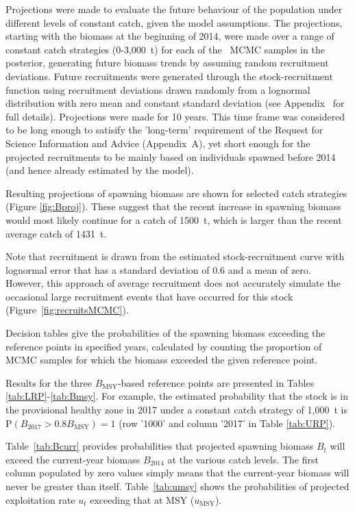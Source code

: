 \documentclass[11pt]{book}
\newcommand{\Bmsy}{B_\mathrm{MSY}}
\begin{document}
Projections were made to evaluate the future behaviour of the population under different levels of constant catch, given the model assumptions.  The projections, starting with the biomass at the beginning of 2014, were made over a range of constant catch strategies (0-3,000~t) for each of the \numMCMC~MCMC samples in the posterior, generating future biomass trends by assuming random recruitment deviations.  Future recruitments were generated through the stock-recruitment function using recruitment deviations drawn randomly from a lognormal distribution with zero mean and constant standard deviation (see Appendix~\eqnchapter{} for full details). Projections were made for 10 years. This time frame was considered to be long enough to satisify the 'long-term' requirement of the Request for Science Information and Advice (Appendix~A), yet short enough for the projected recruitments to be mainly based on individuals spawned before 2014 (and hence already estimated by the model).

Resulting projections of spawning biomass are shown for selected catch strategies (Figure \ref{fig:Bproj}). These suggest that the recent increase in spawning biomass would most likely continue for a catch of 1500~t, which is  larger  than the recent average catch of 1431~t. 

Note that recruitment is drawn from the estimated stock-recruitment curve with lognormal error that has a standard deviation of 0.6 and a mean of zero. However, this approach of average recruitment does not accurately simulate the occasional large recruitment events that have occurred for this stock (Figure~\ref{fig:recruitsMCMC}).

Decision tables give the probabilities of the spawning biomass exceeding the reference points in specified years, calculated by counting the proportion of MCMC samples for which the biomass exceeded the given reference point.

Results for the three $\Bmsy$-based reference points are presented in Tables \ref{tab:LRP}-\ref{tab:Bmsy}. For example, the estimated probability that the stock is in the provisional healthy zone in 2017 under a constant catch strategy of 1,000~t is P$(B_{2017} > 0.8 \Bmsy)=1$ (row '1000' and column '2017' in Table \ref{tab:URP}). 

Table~\ref{tab:Bcurr} provides probabilities that projected spawning biomass $B_t$ will exceed the current-year biomass $B_{2014}$ at the various catch levels. The first column populated by zero values simply means that the current-year biomass will never be greater than itself. Table~\ref{tab:umsy} shows the probabilities of projected exploitation rate $u_t$ exceeding that at MSY ($u_\mathrm{MSY}$).
\end{document}
